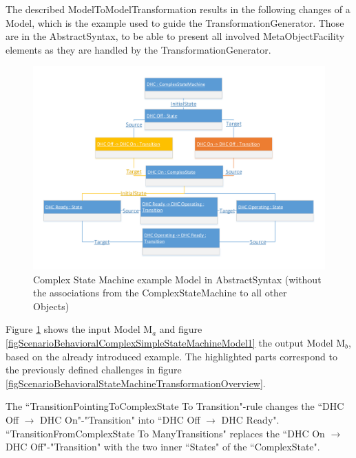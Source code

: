 The described \gls{ModelToModelTransformation} results in the following changes of a \gls{Model}, which is the example used to guide the \gls{TransformationGenerator}. Those are in the \gls{AbstractSyntax}, to be able to present all involved \gls{MetaObjectFacility} elements as they are handled by the \gls{TransformationGenerator}.

\begin{figure}[htb]
	\centering
	\includegraphics[scale=0.6, trim=0cm 1cm 0cm 1cm, clip=true]{Images/ScenarioBehavioralComplexStateMachineModel1.pdf} 
	\caption{Complex State Machine example \gls{Model} in \gls{AbstractSyntax} (without the associations from the ComplexStateMachine to all other \glspl{Object})}
	\label{figScenarioBehavioralComplexStateMachineModel1}
\end{figure}

Figure \ref{figScenarioBehavioralComplexStateMachineModel1} shows the input \gls{Model} M$_a$ and figure \ref{figScenarioBehavioralComplexSimpleStateMachineModel1} the output \gls{Model} M$_b$, based on the already introduced example. The highlighted parts correspond to the previously defined challenges in figure \ref{figScenarioBehavioralStateMachineTransformationOverview}.

The ``TransitionPointingToComplexState To Transition"-rule changes the ``DHC Off  $\rightarrow$  DHC On"-"Transition" into ``DHC Off  $\rightarrow$  DHC Ready". ``TransitionFromComplexState To ManyTransitions" replaces the ``DHC On  $\rightarrow$  DHC Off"-"Transition" with the two inner ``States" of the ``ComplexState".

